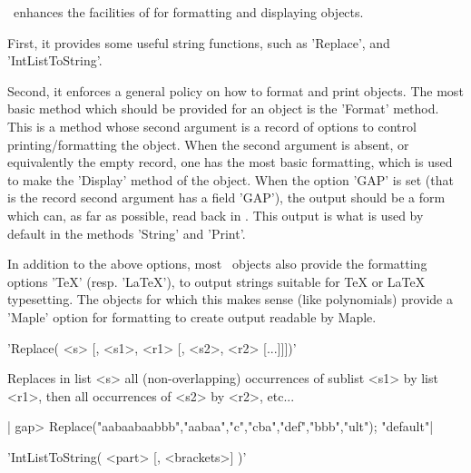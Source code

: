 

\CHEVIE\ enhances the facilities of  for formatting and displaying
objects.

First,  it provides  some useful  string functions,  such as 'Replace', and
'IntListToString'.

Second,  it enforces a general  policy on how to  format and print objects.
The  most  basic  method  which  should  be  provided  for an object is the
'Format'  method. This  is a  method whose  second argument  is a record of
options  to  control  printing/formatting  the  object.  When  the  second
argument  is absent,  or equivalently  the empty  record, one  has the most
basic formatting, which is used to make the 'Display' method of the object.
When  the option  'GAP' is  set (that  is the  record second argument has a
field  'GAP'), the output should  be a form which  can, as far as possible,
read  back in \GAP. This  output is what is  used by default in the methods
'String' and 'Print'.

In  addition to the  above options, most  \CHEVIE\ objects also provide the
formatting  options 'TeX' (resp.  'LaTeX'), to output  strings suitable for
TeX  or LaTeX  typesetting. The  objects for  which this  makes sense (like
polynomials)  provide  a  'Maple'  option  for  formatting to create output
readable by Maple.
%
%

'Replace( <s> [, <s1>, <r1> [, <s2>, <r2> [...]]])'

Replaces in list <s> all (non-overlapping) occurrences of sublist <s1> by
list <r1>, then all occurrences of <s2> by <r2>, etc...

|    gap> Replace("aabaabaabbb","aabaa","c","cba","def","bbb","ult");
    "default"|

%
%

'IntListToString( <part> [, <brackets>] )'

